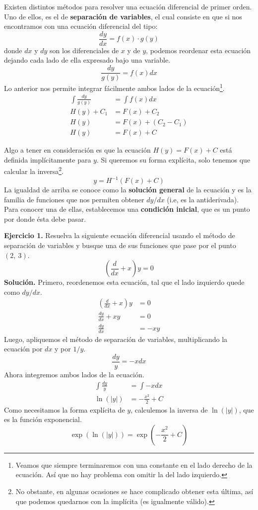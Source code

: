 \documentclass[12pt]{article}
\begin{document}
Existen distintos métodos para resolver una ecuación diferencial de primer orden. Uno de ellos, es el de \textbf{separación de variables}, el cual consiste en que si nos encontramos con una ecuación diferencial del tipo:
\[
  \frac{dy}{dx} = f(x) \cdot g(y)
\]
donde $dx$ y $dy$ son los diferenciales de $x$ y de $y$, podemos reordenar esta ecuación dejando cada lado de ella expresado bajo una variable.
\[
  \frac{dy}{g(y)} = f(x)dx
\]
Lo anterior nos permite integrar fácilmente ambos lados de la ecuación\footnote{Veamos que siempre terminaremos con una constante en el lado derecho de la ecuación. Así que no hay problema con omitir la del lado izquierdo.}.
\begin{align*}
  \int \frac{dy}{g(y)} &= \int f(x)dx \\
  H(y) + C_{1} &= F(x) + C_{2} \\
  H(y) &= F(x) + (C_{2} - C_{1}) \\
  H(y) &= F(x) + C
\end{align*}

\newpage

Algo a tener en consideración es que la ecuación $H(y) = F(x) + C$ está definida implícitamente para $y$. Si queremos su forma explícita, solo tenemos que calcular la inversa\footnote{No obstante, en algunas ocasiones se hace complicado obtener esta última, así que podemos quedarnos con la implícita (es igualmente válido).}.
\[
  y = H^{-1}(F(x) + C)
\]
La igualdad de arriba se conoce como la \textbf{solución general} de la ecuación y es la familia de funciones que nos permiten obtener $dy/dx$ (i.e, es la antiderivada). Para conocer una de ellas, establecemos una \textbf{condición inicial}, que es un punto por donde ésta debe pasar.

\textbf{Ejercicio 1.} \quad Resuelva la siguiente ecuación diferencial usando el método de separación de variables y busque una de sus funciones que pase por el punto $(2, \ 3)$.
\[
  \left(\frac{d}{dx} + x \right) y = 0
\]
\textbf{Solución.} \quad Primero, reordenemos esta ecuación, tal que el lado izquierdo quede como $dy/dx$.
\begin{align*}
  \left(\frac{d}{dx} + x \right) y &= 0 \\
  \frac{dy}{dx} + xy &= 0 \\
  \frac{dy}{dx} &= -xy
\end{align*}
Luego, apliquemos el método de separación de variables, multiplicando la ecuación por $dx$ y por $1/y$.
\[
  \frac{dy}{y} = -xdx
\]
Ahora integremos ambos lados de la ecuación.
\begin{align*}
  \int \frac{dy}{y} &= \int -xdx \\
  \ln(\lvert y \rvert) &= - \frac{x^{2}}{2} + C
\end{align*}
Como necesitamos la forma explícita de $y$, calculemos la inversa de $\ln(\lvert y \rvert)$, que es la función exponencial.
\[
  \exp(\ln(\lvert y \rvert)) = \exp\left(- \frac{x^{2}}{2} + C \right)
\]
\end{document}
